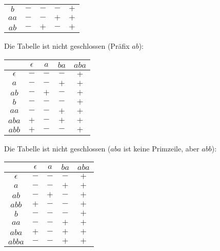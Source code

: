 \documentclass[11pt,a4paper]{article}
\begin{document}
{{\begin{loesung}
\begin{enumerate}
\begin{table}[h!]
\begin{tabular}{c|cccc}
                \hline
                $b$ & $-$ & $-$ & $-$ & $+$ \\
                $aa$ & $-$ & $-$ & $+$ & $+$ \\
                $ab$ & $-$ & $+$ & $-$ & $+$ \\
            \end{tabular}
        \end{table}
        \FloatBarrier
        Die Tabelle ist nicht geschlossen (Präfix $ab$):
        \begin{table}[h!]
            \centering
            \begin{tabular}{c|cccc}
                & $\epsilon$ & $a$ & $ba$ & $aba$ \\
                \hline
                $\epsilon$ & $-$ & $-$ & $-$ & $+$ \\
                $a$ & $-$ & $-$ & $+$ & $+$ \\
                $ab$ & $-$ & $+$ & $-$ & $+$ \\
                \hline
                $b$ & $-$ & $-$ & $-$ & $+$ \\
                $aa$ & $-$ & $-$ & $+$ & $+$ \\
                $aba$ & $+$ & $-$ & $+$ & $+$ \\
                $abb$ & $+$ & $-$ & $-$ & $+$ \\
            \end{tabular}
        \end{table}
        \FloatBarrier
        Die Tabelle ist nicht geschlossen ($aba$ ist keine Primzeile, aber $abb$):
        \begin{table}[h!]
            \centering
            \begin{tabular}{c|cccc}
                & $\epsilon$ & $a$ & $ba$ & $aba$ \\
                \hline
                $\epsilon$ & $-$ & $-$ & $-$ & $+$ \\
                $a$ & $-$ & $-$ & $+$ & $+$ \\
                $ab$ & $-$ & $+$ & $-$ & $+$ \\
                $abb$ & $+$ & $-$ & $-$ & $+$ \\
                \hline
                $b$ & $-$ & $-$ & $-$ & $+$ \\
                $aa$ & $-$ & $-$ & $+$ & $+$ \\
                $aba$ & $+$ & $-$ & $+$ & $+$ \\
                $abba$ & $-$ & $-$ & $+$ & $+$ \\

\end{tabular}
\end{table}
\end{enumerate}
\end{loesung}}}
\end{document}
